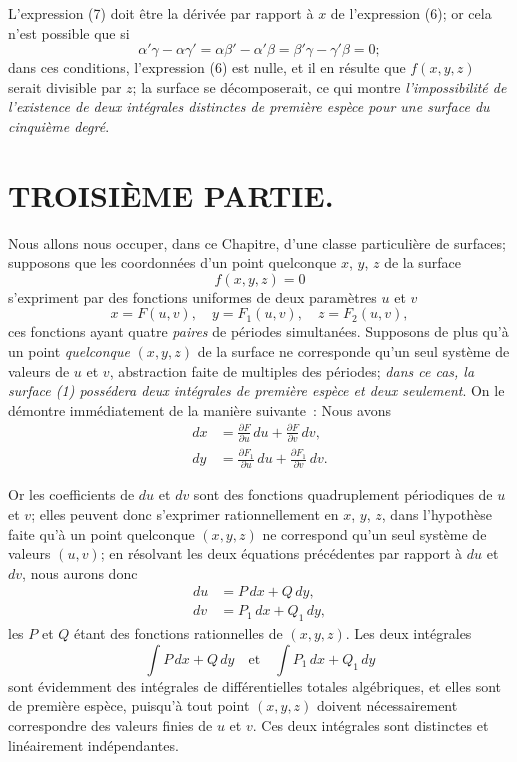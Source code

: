 \documentclass{article}
\begin{document}
L'expression (7) doit être la dérivée par rapport à $x$ de l'expression (6); or cela n'est possible que si
\[
\alpha'\gamma - \alpha\gamma' = \alpha\beta' - \alpha'\beta = \beta'\gamma - \gamma'\beta = 0;
\]
dans ces conditions, l'expression (6) est nulle, et il en résulte que $f(x, y, z)$ serait divisible par $z$; la surface se décomposerait, ce qui montre \emph{l'impossibilité de l'existence de deux intégrales distinctes de première espèce pour une surface du cinquième degré}.

\section*{TROISIÈME PARTIE.}

Nous allons nous occuper, dans ce Chapitre, d'une classe particulière de surfaces; supposons que les coordonnées d'un point quelconque $x$, $y$, $z$ de la surface
\[
f(x, y, z) = 0
\tag{1}
\]
s'expriment par des fonctions uniformes de deux paramètres $u$ et $v$
\[
x = F(u, v), \quad y = F_{1}(u, v), \quad z = F_{2}(u, v),
\]
ces fonctions ayant quatre \emph{paires} de périodes simultanées. Supposons de plus qu'à un point \emph{quelconque} $(x, y, z)$ de la surface ne corresponde qu'un seul système de valeurs de $u$ et $v$, abstraction faite de multiples des périodes; \emph{dans ce cas, la surface (1) possédera deux intégrales de première espèce et deux seulement}. On le démontre immédiatement de la manière suivante~:
Nous avons
\[
\begin{aligned}
dx &= \frac{\partial F}{\partial u}\,du + \frac{\partial F}{\partial v}\,dv, \\
dy &= \frac{\partial F_{1}}{\partial u}\,du + \frac{\partial F_{1}}{\partial v}\,dv.
\end{aligned}
\]

Or les coefficients de $du$ et $dv$ sont des fonctions quadruplement périodiques de $u$ et $v$; elles peuvent donc s'exprimer rationnellement en $x$, $y$, $z$, dans l'hypothèse faite qu'à un point quelconque $(x, y, z)$ ne correspond qu'un seul système de valeurs $(u, v)$; en résolvant les deux équations précédentes par rapport à $du$ et $dv$, nous aurons donc
\[
\begin{aligned}
du &= P\,dx + Q\,dy, \\
dv &= P_{1}\,dx + Q_{1}\,dy,
\end{aligned}
\]
les $P$ et $Q$ étant des fonctions rationnelles de $(x, y, z)$. Les deux intégrales
\[
\int P\,dx + Q\,dy \quad \text{et} \quad \int P_{1}\,dx + Q_{1}\,dy
\]
sont évidemment des intégrales de différentielles totales algébriques, et elles sont de première espèce, puisqu'à tout point $(x, y, z)$ doivent nécessairement correspondre des valeurs finies de $u$ et $v$. Ces deux intégrales sont distinctes et linéairement indépendantes.
\end{document}
